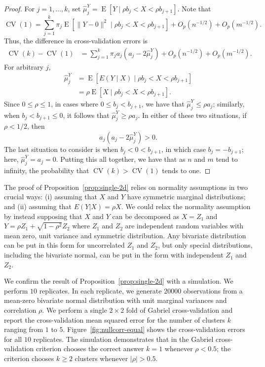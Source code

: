 \documentclass[12pt]{article}
\newcommand{\CV}{\operatorname{CV}}
\newcommand{\E}{\operatorname{E}}
\newcommand{\OhP}{O_p}
\newcommand{\hmuY}{\hat \mu^{Y}}
\begin{document}
\begin{proof}
For $j = 1, \dotsc, k$,
set
\(
  \hmuY_j =
  \E[ Y  \mid \rho b_j < X < \rho b_{j+1}].
\)
Note that
\[
  \CV(1)
    = 
  \sum_{j=1}^{k}
    \pi_j
    \E[ \|Y - 0\|^2 \mid \rho b_j < X < \rho b_{j+1}]
  + \OhP(n^{-1/2})
  + \OhP(m^{-1/2}).
\]
Thus, the difference in cross-validation errors is
\begin{align*}
\CV(k) - \CV(1)
  &=
  \sum_{j=1}^{k}
    \pi_j
    a_j
    (a_j - 2 \hmuY_j)
  + \OhP(n^{-1/2})
  + \OhP(m^{-1/2}).
\end{align*}
For arbitrary $j$,
\begin{align*}
  \hmuY_j &=
  \E[ E(Y\mid X)  \mid \rho b_j < X < \rho b_{j+1}]
\\
  &= \rho \E[ X  \mid \rho b_j < X < \rho b_{j+1}].
\end{align*}
Since $0 \leq \rho \leq 1$,
in cases where $0 \leq b_j < b_{j+1}$, we have that
$\hmuY_j \leq \rho a_j$; similarly, when $b_j < b_{j+1} \leq 0$, it follows
that $\hmuY_j \geq \rho a_j$. In either of these two situations, if $\rho <
1/2$, then
\[
  a_j (a_j - 2 \hmuY_j) > 0.
\]
The last situation to consider is when $b_j < 0 < b_{j+1}$, in which case
$b_j = - b_{j+1}$; here, $\hmuY_j = a_j = 0$.
Putting this all together, we have that as $n$ and $m$ tend to infinity,
the probability that
\(
  \CV(k) > \CV(1)
\)
tends to one.
\end{proof}


The proof of Proposition~\ref{prop:single-2d} relies on normality assumptions
in two crucial ways: (i) assuming that $X$ and $Y$ have symmetric marginal
distributions; and (ii) assuming that $E(Y|X) = \rho X$. We could relax the
normality assumption by instead supposing that $X$ and $Y$ can be decomposed
as $X = Z_1$ and $Y = \rho Z_1 + \sqrt{1-\rho^2}Z_2$ where $Z_1$ and $Z_2$ are
independent random variables with mean zero, unit variance and symmetric
distribution. Any bivariate distribution can be put in this form for
uncorrelated $Z_1$ and $Z_2$, but only special distributions, including the
bivariate normal, can be put in the form with independent $Z_1$ and $Z_2$.



We confirm the result of Proposition~\ref{prop:single-2d} with a simulation.
We perform $10$ replicates.  In each replicate, we generate $20000$
observations from a mean-zero bivariate normal distribution with unit marginal
variances and correlation $\rho$.  We perform a single $2 \times 2$ fold of
Gabriel cross-validation and report the cross-validation mean squared error
for the number of clusters $k$ ranging from $1$ to $5$.
Figure~\ref{fig:nullcorr-equal} shows the cross-validation errors for all $10$
replicates.  The simulation demonstrates that in the Gabriel cross-validation
criterion chooses the correct answer $k = 1$ whenever $\rho < 0.5$; the
criterion chooses $k \geq 2$ clusters whenever $|\rho| > 0.5$.
\end{document}
